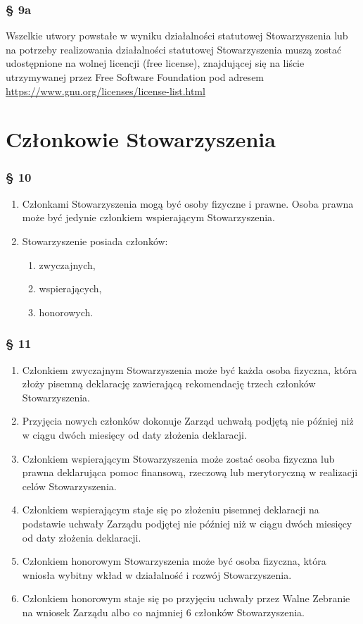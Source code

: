 \documentclass{article}
\newcommand{\myparagraph}[1]{\subsubsection*{#1}}
\begin{document}
\myparagraph{§ 9a}
Wszelkie utwory powstałe w wyniku działalności statutowej Stowarzyszenia lub na potrzeby realizowania działalności statutowej Stowarzyszenia muszą zostać udostępnione na wolnej licencji (free license), znajdującej się na liście utrzymywanej przez Free Software Foundation pod adresem \url{https://www.gnu.org/licenses/license-list.html}

\section{Członkowie Stowarzyszenia}
\myparagraph{§ 10}
\begin{enumerate}
\item
  Członkami Stowarzyszenia mogą być osoby fizyczne i prawne. Osoba prawna może być jedynie członkiem wspierającym Stowarzyszenia.
\item
  Stowarzyszenie posiada członków:
  \begin{enumerate}
  \def\labelenumii{\alph{enumii}.}
  \item
    zwyczajnych,
  \item
    wspierających,
  \item
    honorowych.
  \end{enumerate}
\end{enumerate}

\myparagraph{§ 11}
\begin{enumerate}
\item
  Członkiem zwyczajnym Stowarzyszenia może być każda osoba fizyczna, która złoży pisemną deklarację zawierającą rekomendację trzech członków Stowarzyszenia.
\item
  Przyjęcia nowych członków dokonuje Zarząd uchwałą podjętą nie później niż w ciągu dwóch miesięcy od daty złożenia deklaracji.
\item
  Członkiem wspierającym Stowarzyszenia może zostać osoba fizyczna lub prawna deklarująca pomoc finansową, rzeczową lub merytoryczną w realizacji celów Stowarzyszenia.
\item
  Członkiem wspierającym staje się po złożeniu pisemnej deklaracji na podstawie uchwały Zarządu podjętej nie później niż w ciągu dwóch miesięcy od daty złożenia deklaracji.
\item
  Członkiem honorowym Stowarzyszenia może być osoba fizyczna, która wniosła wybitny wkład w działalność i rozwój Stowarzyszenia.
\item
  Członkiem honorowym staje się po przyjęciu uchwały przez Walne Zebranie na wniosek Zarządu albo co najmniej 6 członków Stowarzyszenia.
\end{enumerate}
\end{document}

